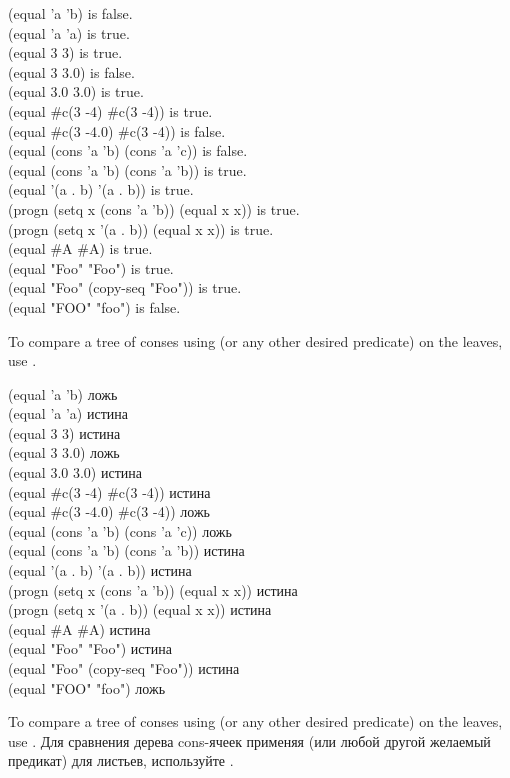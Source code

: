 \begin{defun}[Function]
\begin{lisp}
(equal 'a 'b) \textrm{is false.} \\
(equal 'a 'a) \textrm{is true.} \\
(equal 3 3) \textrm{is true.} \\
(equal 3 3.0) \textrm{is false.} \\
(equal 3.0 3.0) \textrm{is true.} \\
(equal \#c(3 -4) \#c(3 -4)) \textrm{is true.} \\
(equal \#c(3 -4.0) \#c(3 -4)) \textrm{is false.} \\
(equal (cons 'a 'b) (cons 'a 'c)) \textrm{is false.} \\
(equal (cons 'a 'b) (cons 'a 'b)) \textrm{is true.} \\
(equal '(a . b) '(a . b)) \textrm{is true.} \\
(progn (setq x (cons 'a 'b)) (equal x x)) \textrm{is true.} \\
(progn (setq x '(a . b)) (equal x x)) \textrm{is true.} \\
(equal \#{\Xbackslash}A \#{\Xbackslash}A) \textrm{is true.} \\
(equal "Foo" "Foo") \textrm{is true.} \\
(equal "Foo" (copy-seq "Foo")) \textrm{is true.} \\
(equal "FOO" "foo") \textrm{is false.}
\end{lisp}
To compare a tree of conses using 
(or any other desired predicate) on the leaves, use .

\begin{lisp}
(equal 'a 'b) \textrm{ложь} \\
(equal 'a 'a) \textrm{истина} \\
(equal 3 3) \textrm{истина} \\
(equal 3 3.0) \textrm{ложь} \\
(equal 3.0 3.0) \textrm{истина} \\
(equal \#c(3 -4) \#c(3 -4)) \textrm{истина} \\
(equal \#c(3 -4.0) \#c(3 -4)) \textrm{ложь} \\
(equal (cons 'a 'b) (cons 'a 'c)) \textrm{ложь} \\
(equal (cons 'a 'b) (cons 'a 'b)) \textrm{истина} \\
(equal '(a . b) '(a . b)) \textrm{истина} \\
(progn (setq x (cons 'a 'b)) (equal x x)) \textrm{истина} \\
(progn (setq x '(a . b)) (equal x x)) \textrm{истина} \\
(equal \#{\Xbackslash}A \#{\Xbackslash}A) \textrm{истина} \\
(equal "Foo" "Foo") \textrm{истина} \\
(equal "Foo" (copy-seq "Foo")) \textrm{истина} \\
(equal "FOO" "foo") \textrm{ложь}
\end{lisp}
To compare a tree of conses using 
(or any other desired predicate) on the leaves, use .
Для сравнения дерева cons-ячеек применяя  (или любой другой желаемый
предикат) для листьев, используйте .


\end{defun}
